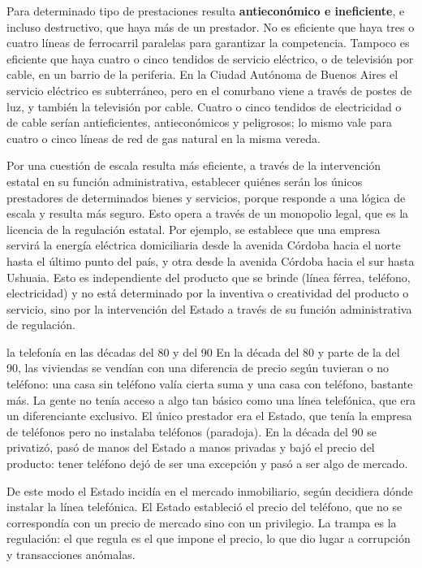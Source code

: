 \documentclass[12pt,oneside]{book}
\begin{document}
Para determinado tipo de prestaciones resulta \textbf{antiecon\'omico e ineficiente}, e incluso destructivo, que haya m\'as de un prestador. No es eficiente que haya tres o cuatro l\'ineas de ferrocarril paralelas para garantizar la competencia. Tampoco es eficiente que haya cuatro o cinco tendidos de servicio el\'ectrico, o de televisi\'on por cable, en un barrio de la periferia. En la Ciudad Aut\'onoma de Buenos Aires el servicio el\'ectrico es subterr\'aneo, pero en el conurbano viene a trav\'es de postes de luz, y tambi\'en la televisi\'on por cable. Cuatro o cinco tendidos de electricidad o de cable ser\'ian antieficientes, antiecon\'omicos y peligrosos; lo mismo vale para cuatro o cinco l\'ineas de red de gas natural en la misma vereda.

Por una cuesti\'on de escala resulta m\'as eficiente, a trav\'es de la intervenci\'on estatal en su funci\'on administrativa, establecer qui\'enes ser\'an los \'unicos prestadores de determinados bienes y servicios, porque responde a una l\'ogica de escala y resulta m\'as seguro. Esto opera a trav\'es de un monopolio legal, que es la licencia de la regulaci\'on estatal. Por ejemplo, se establece que una empresa servir\'a la energ\'ia el\'ectrica domiciliaria desde la avenida C\'ordoba hacia el norte hasta el \'ultimo punto del pa\'is, y otra desde la avenida C\'ordoba hacia el sur hasta Ushuaia. Esto es independiente del producto que se brinde (l\'inea f\'errea, tel\'efono, electricidad) y no est\'a determinado por la inventiva o creatividad del producto o servicio, sino por la intervenci\'on del Estado a trav\'es de su funci\'on administrativa de regulaci\'on.

\begin{example}{la telefon\'ia en las d\'ecadas del 80 y del 90}
En la d\'ecada del 80 y parte de la del 90, las viviendas se vend\'ian con una diferencia de precio seg\'un tuvieran o no tel\'efono: una casa sin tel\'efono val\'ia cierta suma%
{} y una casa con tel\'efono, bastante m\'as. La gente no ten\'ia acceso a algo tan b\'asico como una l\'inea telef\'onica, que era un diferenciante exclusivo. El \'unico prestador era el Estado, que ten\'ia la empresa de tel\'efonos pero no instalaba tel\'efonos (paradoja). En la d\'ecada del 90 se privatiz\'o, pas\'o de manos del Estado a manos privadas y baj\'o el precio del producto: tener tel\'efono dej\'o de ser una excepci\'on y pas\'o a ser algo de mercado.

De este modo el Estado incid\'ia en el mercado inmobiliario, seg\'un decidiera d\'onde instalar la l\'inea telef\'onica. El Estado estableci\'o el precio del tel\'efono, que no se correspond\'ia con un precio de mercado sino con un privilegio. La trampa es la regulaci\'on: el que regula es el que impone el precio, lo que dio lugar a corrupci\'on y transacciones an\'omalas.
\end{example}
\end{document}
